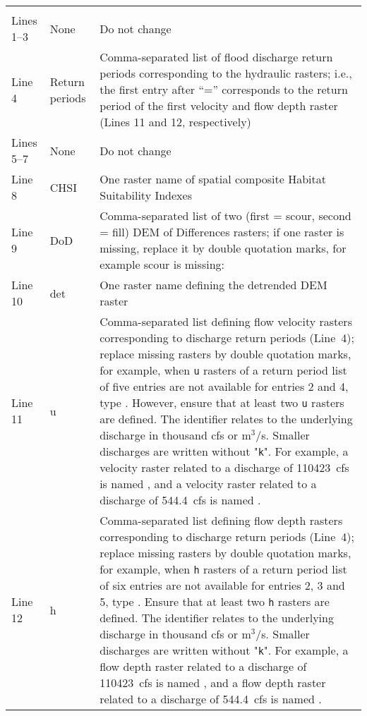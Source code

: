 \begin{tabular}{l p{} L{0.65\textwidth}}
\\
Lines 1--3 & None &Do not change\\ 
Line  4 & Return periods & Comma-separated list of flood discharge return periods corresponding to the hydraulic rasters; i.e., the first entry after ``='' corresponds to the return period of the first velocity and flow depth raster (Lines 11 and 12, respectively)\\
Lines 5--7 & None &Do not change\\ 
Line  8 & CHSI & One raster name of spatial composite Habitat Suitability Indexes \\
Line  9 & DoD  & Comma-separated list of two (first = scour, second = fill) DEM of Differences rasters; if one raster is missing, replace it by double quotation marks, for example scour is missing: \\ 
Line 10 & det  & One raster name defining the detrended DEM raster\\
Line 11 & u		 & Comma-separated list defining flow velocity rasters corresponding to discharge return periods (Line~4); replace missing rasters by double quotation marks, for example, when \texttt{u} rasters of a return period list of five entries are not available for entries 2 and 4, type . However, ensure that at least two \texttt{u} rasters are defined. The  identifier relates to the underlying discharge in thousand cfs or m$^3$/s. Smaller discharges are written without "\texttt{k}". For example, a velocity raster related to a discharge of 110423~cfs is named , and a velocity raster related to a discharge of 544.4~cfs  is named .\\ 
Line 12 & h		 & Comma-separated list defining flow depth rasters corresponding to discharge return periods (Line~4); replace missing rasters by double quotation marks, for example, when \texttt{h} rasters of a return period list of six entries are not available for entries 2, 3 and 5, type . Ensure that at least two \texttt{h} rasters are defined. The  identifier relates to the underlying discharge in thousand cfs or m$^3$/s. Smaller discharges are written without "\texttt{k}". For example, a flow depth raster related to a discharge of 110423~cfs is named , and a flow depth raster related to a discharge of 544.4~cfs  is named .\\

\end{tabular}
